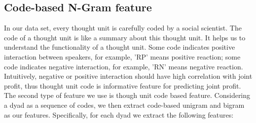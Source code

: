 \documentclass[11pt]{article} %
\begin{document}
\subsection{Code-based N-Gram feature}
In our data set, every thought unit is carefully coded by a social scientist. The code of a thought unit is like a summary about this thought unit. It helps us to understand the functionality of a thought unit. Some code indicates positive interaction between speakers, for example, 'RP' means positive reaction; some code indicates negative interaction, for example, 'RN' means negative reaction. Intuitively, negative or positive interaction should have high correlation with joint profit, thus thought unit code is informative feature for predicting joint profit. The second type of feature we use is though unit code based feature. Considering a dyad as a sequence of codes, we then extract code-based unigram and bigram as our features. Specifically, for each dyad we extract the following features:
\end{document}
